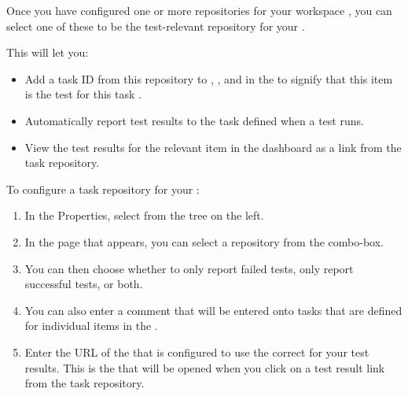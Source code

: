 Once you have configured one or more repositories for your workspace \bxpref{}, you can select one of these to be the test-relevant repository for your \gdproject{}. 

This will let you:
\begin{itemize}
\item Add a task ID from this repository to \gdcases{}, \gdsuites{}, and \gdjobs{} in the \gdproject{} to signify that this item is the test for this task .
\item Automatically report test results to the task defined when a test runs.
\item View the test results for the relevant item in the dashboard as a link from the task repository.
\end{itemize}

To configure a task repository for your \gdproject{}:

\begin{enumerate}
\item In the \gdproject{} Properties, select  from the tree on the left.
\item In the page that appears, you can select a repository from the combo-box.
\item You can then choose whether to only report failed tests, only report successful tests, or both.
\item You can also enter a comment that will be entered onto tasks that are defined for individual items in the \gdproject{}.
\item Enter the URL of the \dash{} that is configured to use the correct \gddb{} for your test results. This is the \dash{} that will be opened when you click on a test result link from the task repository.
\end{enumerate}

